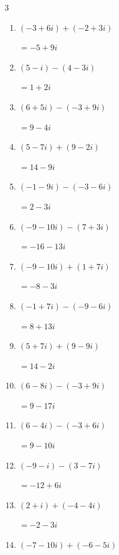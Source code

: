 \begin{multicols}{3}
\begin{enumerate}
  \item $\displaystyle (-3+6i) + (-2+3i)$

        $\displaystyle =-5+9i$

  \item $\displaystyle (5-i) - (4-3i)$

        $\displaystyle =1+2i$

  \item $\displaystyle (6+5i) - (-3+9i)$

        $\displaystyle =9-4i$

  \item $\displaystyle (5-7i) + (9-2i)$

        $\displaystyle =14-9i$

  \item $\displaystyle (-1-9i) - (-3-6i)$

        $\displaystyle =2-3i$

  \item $\displaystyle (-9-10i) - (7+3i)$

        $\displaystyle =-16-13i$

  \item $\displaystyle (-9-10i) + (1+7i)$

        $\displaystyle =-8-3i$

  \item $\displaystyle (-1+7i) - (-9-6i)$

        $\displaystyle =8+13i$

  \item $\displaystyle (5+7i) + (9-9i)$

        $\displaystyle =14-2i$

  \item $\displaystyle (6-8i) - (-3+9i)$

        $\displaystyle =9-17i$

  \item $\displaystyle (6-4i) - (-3+6i)$

        $\displaystyle =9-10i$

  \item $\displaystyle (-9-i) - (3-7i)$

        $\displaystyle =-12+6i$

  \item $\displaystyle (2+i) + (-4-4i)$

        $\displaystyle =-2-3i$

  \item $\displaystyle (-7-10i) + (-6-5i)$


\end{enumerate}
\end{multicols}
